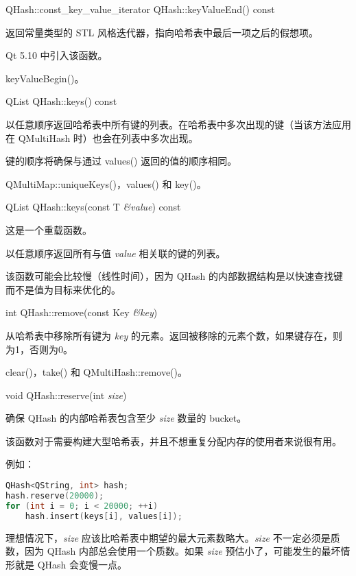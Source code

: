 QHash::const\_key\_value\_iterator QHash::keyValueEnd() const

返回常量类型的 STL 风格迭代器，指向哈希表中最后一项之后的假想项。

Qt 5.10 中引入该函数。

\begin{seeAlso}
keyValueBegin()。
\end{seeAlso}

QList QHash::keys() const

以任意顺序返回哈希表中所有键的列表。在哈希表中多次出现的键（当该方法应用在 QMultiHash 时）也会在列表中多次出现。

键的顺序将确保与通过 values() 返回的值的顺序相同。


\begin{seeAlso}
QMultiMap::uniqueKeys()，values() 和 key()。
\end{seeAlso}

QList QHash::keys(const T \emph{\&value}) const

这是一个重载函数。

以任意顺序返回所有与值 \emph{value} 相关联的键的列表。

该函数可能会比较慢（线性时间），因为 QHash 的内部数据结构是以快速查找键而不是值为目标来优化的。

int QHash::remove(const Key \emph{\&key})

从哈希表中移除所有键为 \emph{key} 的元素。返回被移除的元素个数，如果键存在，则为1，否则为0。


\begin{seeAlso}
clear()，take() 和 QMultiHash::remove()。
\end{seeAlso}


void QHash::reserve(int \emph{size})

确保 QHash 的内部哈希表包含至少 \emph{size} 数量的 bucket。

该函数对于需要构建大型哈希表，并且不想重复分配内存的使用者来说很有用。

例如：

\begin{lstlisting}[language=C++]
QHash<QString, int> hash;
hash.reserve(20000);
for (int i = 0; i < 20000; ++i)
    hash.insert(keys[i], values[i]);
\end{lstlisting}

理想情况下，\emph{size} 应该比哈希表中期望的最大元素数略大。\emph{size} 不一定必须是质数，因为 QHash 内部总会使用一个质数。如果 \emph{size} 预估小了，可能发生的最坏情形就是 QHash 会变慢一点。

